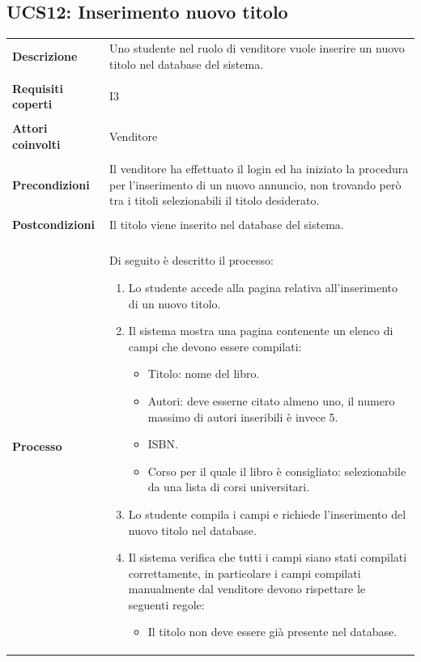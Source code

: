 \documentclass[10pt,a4paper]{report}
\begin{document}
	\subsection{UCS12: Inserimento nuovo titolo}
	\begin{tabular}{lp{}}
		\textbf{Descrizione}&Uno studente nel ruolo di venditore vuole inserire un nuovo titolo nel database del sistema.\\
		\\
		\textbf{Requisiti coperti}&I3\\
		\\
		\textbf{Attori coinvolti}&Venditore\\
		\\
		\textbf{Precondizioni}&Il venditore ha effettuato il login ed ha iniziato la procedura per l'inserimento di un nuovo annuncio, non trovando però tra i titoli selezionabili il titolo desiderato.\\
		\\
		\textbf{Postcondizioni}&Il titolo viene inserito nel database del sistema.\\
		\\
		\textbf{Processo}&Di seguito è descritto il processo:
		\begin{enumerate}
			\item Lo studente accede alla pagina relativa all'inserimento di un nuovo titolo.
			\item Il sistema mostra una pagina contenente un elenco di campi che devono essere compilati:
			\begin{itemize}
				\item Titolo: nome del libro.
				\item Autori: deve esserne citato almeno uno, il numero massimo di autori inseribili è invece 5.
				\item ISBN.
				\item Corso per il quale il libro è consigliato: selezionabile da una lista di corsi universitari.
			\end{itemize}
			\item Lo studente compila i campi e richiede l'inserimento del nuovo titolo nel database.
			\item Il sistema verifica che tutti i campi siano stati compilati correttamente, in particolare i campi compilati manualmente dal venditore devono rispettare le seguenti regole:
			\begin{itemize}
				\item Il titolo non deve essere già presente nel database.

\end{itemize}
\end{enumerate}
\end{tabular}
\end{document}
